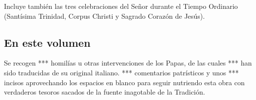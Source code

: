 \begin{bodyintro}\small *Incluye también las tres celebraciones del Señor durante el Tiempo Ordinario (Santísima Trinidad, Corpus Christi y Sagrado Corazón de Jesús).\end{bodyintro}

\subsection{En este volumen}

Se recogen *** homilías u otras intervenciones de los Papas, de las cuales *** han sido traducidas de su original italiano. *** comentarios patrísticos y unos *** incisos aprovechando los espacios en blanco para seguir nutriendo esta obra con verdaderos tesoros sacados de la fuente inagotable de la Tradición.

